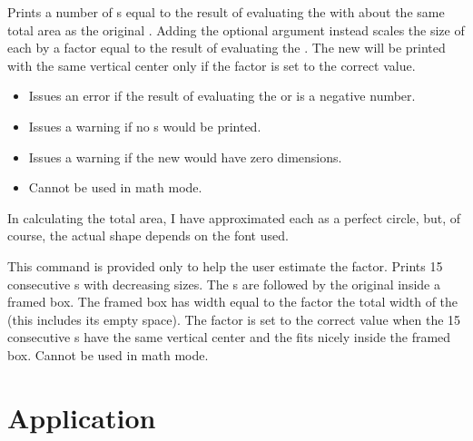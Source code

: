 \documentclass{beery}
\begin{document}
\begin{function}{\scaletextbullets}
  \begin{syntax}
      
  \end{syntax}
  Prints a number of s equal to the result of evaluating the  with about the same total area as the original .\footnotemark{}
  Adding the optional argument instead scales the size of each  by a factor equal to the result of evaluating the .
  The new  will be printed with the same vertical center only if the  factor is set to the correct value.

  \begin{itemize}
    \item
    Issues an error if the result of evaluating the  or  is a negative number.
    \item
    Issues a warning if no s would be printed.
    \item
    Issues a warning if the new  would have zero dimensions.
    \item
    Cannot be used in math mode.
  \end{itemize}
\end{function}
\footnotetext
  {%
    In calculating the total area, I have approximated each  as a perfect circle, but, of course, the actual shape depends on the font used.%
  }

\begin{function}{\scaletextbulletdebug}
  \begin{syntax}
  \end{syntax}
  This command is provided only to help the user estimate the  factor.
  Prints \num{15} consecutive s with decreasing sizes.
  The s are followed by the original  inside a framed box.
  The framed box has width equal to the  factor \texttimes{} the total width of the  (this includes its empty space).
  The  factor is set to the correct value when the \num{15} consecutive s have the same vertical center and the  fits nicely inside the framed box.
  Cannot be used in math mode.
\end{function}


\section{Application}
\label{sec:application}
\end{document}

